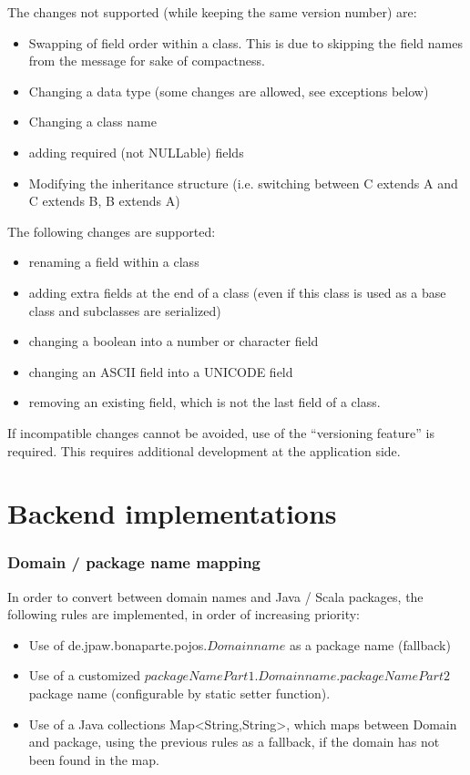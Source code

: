 \documentclass[11pt,a4paper,oneside]{article}
\begin{document}
The changes not supported (while keeping the same version number) are:
\begin{itemize}
    \item Swapping of field order within a class. This is due to skipping the field names from the message for sake of
    compactness.
    \item Changing a data type (some changes are allowed, see exceptions below)
    \item Changing a class name
    \item adding required (not NULLable) fields
    \item Modifying the inheritance structure (i.e. switching between C extends A and C extends B, B extends A)
\end{itemize}

The following changes are supported:
\begin{itemize}
    \item renaming a field within a class
    \item adding extra fields at the end of a class (even if this class is used as a base class and subclasses are serialized)
    \item changing a boolean into a number or character field
    \item changing an ASCII field into a UNICODE field
    \item removing an existing field, which is not the last field of a class. 
\end{itemize}

If incompatible changes cannot be avoided, use of the ``versioning feature'' is required. This requires additional development
at the application side.







\section{Backend implementations}

\subsubsection{Domain / package name mapping}
In order to convert between domain names and Java / Scala packages, the following rules are implemented, in order of increasing
priority:
\begin{itemize}
    \item Use of {\ttfamily de.jpaw.bonaparte.pojos.}$Domainname$ as a package name (fallback)
    \item Use of a customized $packageNamePart1$.$Domainname$.$packageNamePart2$ package name (configurable by static setter
    function).
    \item Use of a Java collections {\ttfamily Map<String,String>}, which maps between Domain and package, using the previous rules as a
    fallback, if the domain has not been found in the map.
\end{itemize}
\end{document}
